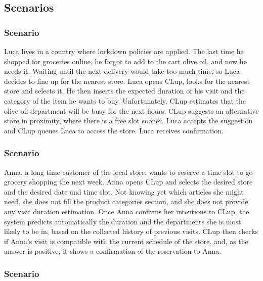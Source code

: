 \documentclass[../../main.tex]{subfiles}
\begin{document}
\subsection{Scenarios}


\subsubsection{Scenario }

  Luca lives in a country where lockdown policies are applied. The last time he shopped for groceries online, 
  he forgot to add to the cart olive oil, and now he needs it. Waiting until the next delivery would take too much time, 
  so Luca decides to line up for the nearest store. 
  Luca opens CLup, looks for the nearest store and selects it. 
  He then inserts the expected duration of his visit and the category of the item he wants to buy. 
  Unfortunately, CLup estimates that the olive oil department will be busy for the next hours. 
  CLup suggests an alternative store in proximity, where there is a free slot sooner. 
  Luca accepts the suggestion and CLup queues Luca to access the store. Luca receives confirmation.

\subsubsection{Scenario }

  Anna, a long time customer of the local store, wants to reserve a time slot to go grocery shopping the next week. 
  Anna opens CLup and selects the desired store and the desired date and time slot. 
  Not knowing yet which articles she might need, she does not fill the product categories section, 
  and she does not provide any visit duration estimation. Once Anna confirms her intentions to CLup, 
  the system predicts automatically the duration and the departments she is most likely to be in, 
  based on the collected history of previous visits. CLup then checks if Anna's visit is compatible with the 
  current schedule of the store, and, as the answer is positive, it shows a confirmation of the reservation to Anna.

\subsubsection{Scenario }
\end{document}

